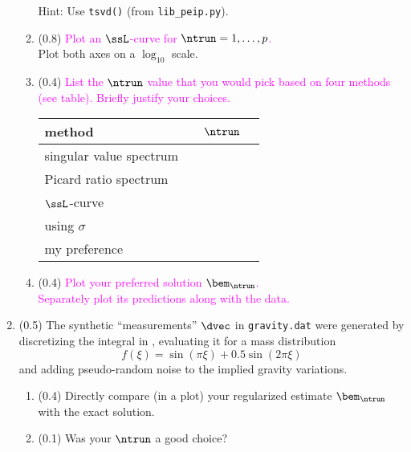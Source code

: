 \documentclass[11pt,titlepage,fleqn]{article}
\newcommand{\mv}{\xi}  %
\newcommand{\tcolor}{magenta}
\begin{document}
\begin{enumerate}
\begin{enumerate}
Hint: Use \verb+tsvd()+ (from \verb+lib_peip.py+).

\item (0.8) \textcolor{\tcolor}{Plot an $\ssL$-curve \citep[][p.~95]{Aster} for $\ntrun = 1,\ldots,p$.} \\
Plot both axes on a $\log_{10}$ scale.

\item (0.4) \textcolor{\tcolor}{List the $\ntrun$ value that you would pick based on four methods (see table). Briefly justify your choices.}

\begin{center}
\begin{tabular}{l|l}
\hline
method & $\;\;\;\;\ntrun\;\;\;\;$ \\ \hline\hline
singular value spectrum & \\ \hline
Picard ratio spectrum & \\ \hline
$\ssL$-curve & \\ \hline
using $\sigma$ \\ \hline
my preference \\ \hline
\end{tabular}
\end{center}

\item (0.4) \textcolor{\tcolor}{Plot your preferred solution $\bem_{\ntrun}$. \\
Separately plot its predictions along with the data.}

\end{enumerate}
\label{prob2}


\item (0.5) The synthetic ``measurements'' $\dvec$ in \verb+gravity.dat+ were generated by discretizing the integral in , evaluating it for a mass distribution 
%
\begin{equation}
f(\mv) = \sin(\pi\mv) + 0.5 \sin(2\pi\mv)
\end{equation}
%
and adding pseudo-random noise to the implied gravity variations.

\begin{enumerate}
\item (0.4) Directly compare (in a plot) your regularized estimate $\bem_{\ntrun}$ with the exact solution.
\item (0.1) Was your $\ntrun$ a good choice?
\end{enumerate}

\end{enumerate}
\end{document}
